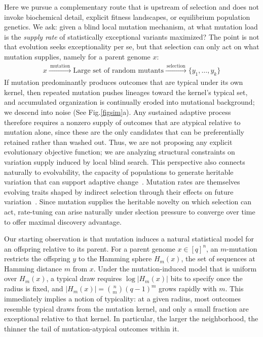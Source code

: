\documentclass[9pt,twocolumn,oneside]{pnas-new}
\def\EQSP{2pt}
\newcommand{\cgather}[2][\EQSP]{\begingroup\setlength\abovedisplayskip{#1}\setlength\belowdisplayskip{#1}\begin{gather} #2 \end{gather}\endgroup\noindent}
\begin{document}
Here we pursue a complementary route that is upstream of selection and does not invoke biochemical detail, explicit fitness landscapes, or equilibrium population genetics. We ask: given a blind local mutation mechanism, at what mutation load is the \emph{supply rate} of statistically exceptional variants maximized? The point is not that evolution seeks exceptionality per se, but that selection can only act on what mutation supplies, namely for a parent genome $x$:
\cgather{x \xrightarrow{\ \textrm{mutation}\ } \textrm{Large set of random mutants}
    \xrightarrow{\ \textrm{selection}\ } \{y_1,\dots,y_k\}}
If mutation predominantly produces outcomes that are typical under its own kernel, then repeated mutation pushes lineages toward the kernel's typical set, and accumulated organization is continually eroded into mutational background; we descend into noise (See Fig.\ref{figsim}a). Any sustained adaptive process therefore requires a nonzero supply of outcomes that are atypical relative to mutation alone, since these are the only candidates that can be preferentially retained rather than washed out. Thus, we are not proposing any explicit evolutionary objective function; we are analyzing  structural constraints on variation supply induced by local blind search.
%
{\color{red}
This perspective also connects naturally to evolvability, the capacity of populations to generate heritable variation that can support adaptive change~\cite{DiazArenasCooper2013,Brookfield2009Evolvability}. Mutation rates are themselves evolving traits shaped by indirect selection through their effects on future variation~\cite{sniegowski2000evolution,Sung2012DriftBarrier}. Since mutation supplies the heritable novelty on which selection can act, rate-tuning can  arise naturally under slection pressure to converge over time to offer maximal discovery advantage.
}
%

Our starting observation is that mutation induces a natural statistical model for an offspring relative to its parent. For a parent genome $x\in[q]^n$, an $m$-mutation restricts the offspring $y$ to the Hamming sphere $H_m(x)$, the set of sequences at Hamming distance $m$ from $x$. Under the mutation-induced model that is uniform over $H_m(x)$, a typical draw requires $\log|H_m(x)|$ bits to specify once the radius is fixed, and
$|H_m(x)|=\binom{n}{m}(q-1)^m$ grows rapidly with $m$. This immediately implies a notion of typicality: at a given radius, most outcomes resemble typical draws from the mutation kernel, and only a small fraction are exceptional relative to that kernel. In particular, the larger the neighborhood, the thinner the tail of mutation-atypical outcomes within it.
\end{document}

